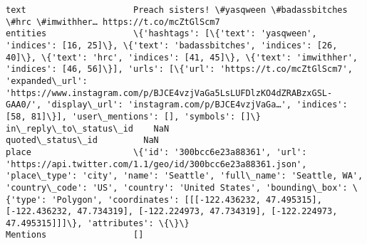 \documentclass[11pt]{article}
\begin{document}
\begin{Verbatim}[commandchars=\\\{\}]
text                     Preach sisters! \#yasqween \#badassbitches \#hrc \#imwithher… https://t.co/mcZtGlScm7                                                                                                                                                                                                                                                                                                                                                         
entities                 \{'hashtags': [\{'text': 'yasqween', 'indices': [16, 25]\}, \{'text': 'badassbitches', 'indices': [26, 40]\}, \{'text': 'hrc', 'indices': [41, 45]\}, \{'text': 'imwithher', 'indices': [46, 56]\}], 'urls': [\{'url': 'https://t.co/mcZtGlScm7', 'expanded\_url': 'https://www.instagram.com/p/BJCE4vzjVaGa5LsLUFDlzKO4dZRABzxGSL-GAA0/', 'display\_url': 'instagram.com/p/BJCE4vzjVaGa…', 'indices': [58, 81]\}], 'user\_mentions': [], 'symbols': []\}
in\_reply\_to\_status\_id    NaN                                                                                                                                                                                                                                                                                                                                                                                                                                       
quoted\_status\_id         NaN                                                                                                                                                                                                                                                                                                                                                                                                                                       
place                    \{'id': '300bcc6e23a88361', 'url': 'https://api.twitter.com/1.1/geo/id/300bcc6e23a88361.json', 'place\_type': 'city', 'name': 'Seattle', 'full\_name': 'Seattle, WA', 'country\_code': 'US', 'country': 'United States', 'bounding\_box': \{'type': 'Polygon', 'coordinates': [[[-122.436232, 47.495315], [-122.436232, 47.734319], [-122.224973, 47.734319], [-122.224973, 47.495315]]]\}, 'attributes': \{\}\}                                    
Mentions                 []                                                                                                                                                                                                                                                                                                                                                                                                                                        

\end{Verbatim}
\end{document}
